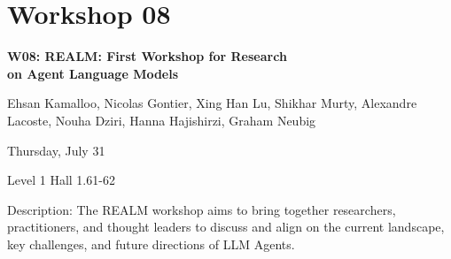 \clearpage



\section[W08: REALM: First Workshop for Research on \\
Agent Language Models]{Workshop 08}
\label{workshop_8}

\begin{center}
    {\Large \textbf{W08: REALM: First Workshop for Research \\
    on Agent Language Models}}\\

 \vspace{5mm}

    Ehsan Kamalloo, Nicolas Gontier, Xing Han Lu, Shikhar Murty, Alexandre Lacoste, Nouha Dziri, Hanna Hajishirzi, Graham Neubig\\

 \vspace{5mm}
 
    Thursday, July 31
    
    Level 1 Hall 1.61-62

\end{center}

Description: The REALM workshop aims to bring together researchers, practitioners, and thought leaders to discuss and align on the current landscape, key challenges, and future directions of LLM Agents.


